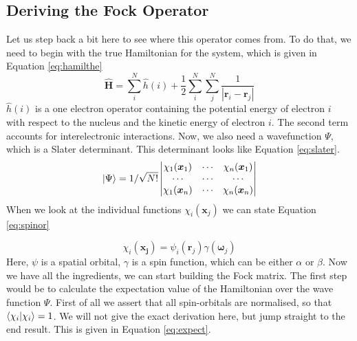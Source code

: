  \subsection{Deriving the Fock Operator}
 \label{subsec:fock matrix}
Let us step back a bit here to see where this operator comes from. To do that, we 
need to begin with the true Hamiltonian for the system, which is given in Equation 
\ref{eq:hamilthe}
\begin{equation}\label{eq:hamilthe}
    \hat{\boldsymbol{H}} = \sum_i^N\hat{h}(i) + \frac{1}{2}\sum_i^N\sum_j^N\frac{1}{|\boldsymbol{r}_i - \boldsymbol{r}_j|}
\end{equation}
$\hat{h}(i)$ is a one electron operator containing the potential energy of
electron $i$ with respect to the nucleus and the kinetic energy of electron $i$.
The second term accounts for interelectronic interactions. Now, we also need a
wavefunction $\Psi$, which is a Slater determinant. This determinant looks like
Equation \ref{eq:slater}.
\begin{equation}\label{eq:slater}
    \ket{\Psi} = 1/\sqrt{N!}\begin{vmatrix}
        \chi_1(\boldsymbol{x}_1) & \cdots & \chi_n(\boldsymbol{x}_1) \\
        \cdots & \cdots & \cdots \\
        \chi_1(\boldsymbol{x}_n) & \cdots & \chi_n(\boldsymbol{x}_n)\\
    \end{vmatrix}
\end{equation}
When we look at the individual functions $\chi_i(\boldsymbol{x}_j)$ we can state Equation 
\ref{eq:spinor}

\begin{equation}\label{eq:spinor}
    \chi_i(\boldsymbol{x_j}) = \psi_i(\boldsymbol{r}_j)\gamma(\boldsymbol{\omega}_j)
\end{equation}
Here, $\psi$ is a spatial orbital, $\gamma$ is a spin function, which can be either
$\alpha$ or $\beta$. Now we have all the ingredients, we can start building the Fock
matrix. The first step would be to calculate the expectation value of the 
Hamiltonian over the wave function $\Psi$. First of all we assert that all spin-orbitals
are normalised, so that $\braket{\chi_i}{\chi_i} = 1$. We will not give the exact 
derivation here, but jump straight to the end result. This is given in Equation 
\ref{eq:expect}.


